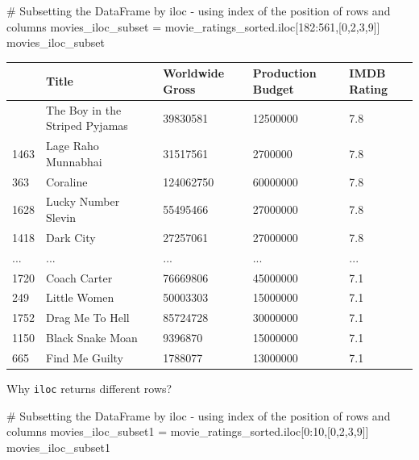 \documentclass[
  letterpaper,
  DIV=11,
  numbers=noendperiod]{scrreprt}
\newenvironment{Shaded}{\begin{snugshade}}{\end{snugshade}}
\newcommand{\CommentTok}[1]{\textcolor[rgb]{0.37,0.37,0.37}{#1}}
\newcommand{\DecValTok}[1]{\textcolor[rgb]{0.68,0.00,0.00}{#1}}
\newcommand{\NormalTok}[1]{\textcolor[rgb]{0.00,0.23,0.31}{#1}}
\newcommand{\OperatorTok}[1]{\textcolor[rgb]{0.37,0.37,0.37}{#1}}
\begin{document}
\begin{Shaded}
\begin{Highlighting}[]
\CommentTok{\# Subsetting the DataFrame by iloc {-} using index of the position of rows and columns}
\NormalTok{movies\_iloc\_subset }\OperatorTok{=}\NormalTok{ movie\_ratings\_sorted.iloc[}\DecValTok{182}\NormalTok{:}\DecValTok{561}\NormalTok{,[}\DecValTok{0}\NormalTok{,}\DecValTok{2}\NormalTok{,}\DecValTok{3}\NormalTok{,}\DecValTok{9}\NormalTok{]]}
\NormalTok{movies\_iloc\_subset}
\end{Highlighting}
\end{Shaded}

\begin{longtable}[]{@{}lllll@{}}
\toprule\noalign{}
& Title & Worldwide Gross & Production Budget & IMDB Rating \\
\midrule\noalign{}
\endhead
\bottomrule\noalign{}
\endlastfoot
227 & The Boy in the Striped Pyjamas & 39830581 & 12500000 & 7.8 \\
1463 & Lage Raho Munnabhai & 31517561 & 2700000 & 7.8 \\
363 & Coraline & 124062750 & 60000000 & 7.8 \\
1628 & Lucky Number Slevin & 55495466 & 27000000 & 7.8 \\
1418 & Dark City & 27257061 & 27000000 & 7.8 \\
... & ... & ... & ... & ... \\
1720 & Coach Carter & 76669806 & 45000000 & 7.1 \\
249 & Little Women & 50003303 & 15000000 & 7.1 \\
1752 & Drag Me To Hell & 85724728 & 30000000 & 7.1 \\
1150 & Black Snake Moan & 9396870 & 15000000 & 7.1 \\
665 & Find Me Guilty & 1788077 & 13000000 & 7.1 \\
\end{longtable}

Why \texttt{iloc} returns different rows?

\begin{Shaded}
\begin{Highlighting}[]
\CommentTok{\# Subsetting the DataFrame by iloc {-} using index of the position of rows and columns}
\NormalTok{movies\_iloc\_subset1 }\OperatorTok{=}\NormalTok{ movie\_ratings\_sorted.iloc[}\DecValTok{0}\NormalTok{:}\DecValTok{10}\NormalTok{,[}\DecValTok{0}\NormalTok{,}\DecValTok{2}\NormalTok{,}\DecValTok{3}\NormalTok{,}\DecValTok{9}\NormalTok{]]}
\NormalTok{movies\_iloc\_subset1}
\end{Highlighting}
\end{Shaded}
\end{document}
